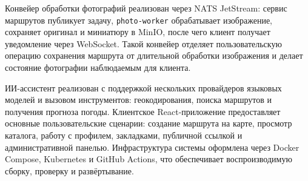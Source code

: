 Конвейер обработки фотографий реализован через NATS JetStream: сервис маршрутов
публикует задачу, \texttt{photo-worker} обрабатывает изображение, сохраняет
оригинал и миниатюру в MinIO, после чего клиент получает уведомление через
WebSocket. Такой конвейер отделяет пользовательскую операцию сохранения маршрута
от длительной обработки изображения и делает состояние фотографии наблюдаемым
для клиента.

ИИ-ассистент реализован с поддержкой нескольких провайдеров языковых моделей и
вызовом инструментов: геокодирования, поиска маршрутов и получения прогноза
погоды. Клиентское React-приложение предоставляет основные пользовательские
сценарии: создание маршрута на карте, просмотр каталога, работу с профилем,
закладками, публичной ссылкой и административной панелью. Инфраструктура системы
оформлена через Docker Compose, Kubernetes и GitHub Actions, что обеспечивает
воспроизводимую сборку, проверку и развёртывание.
